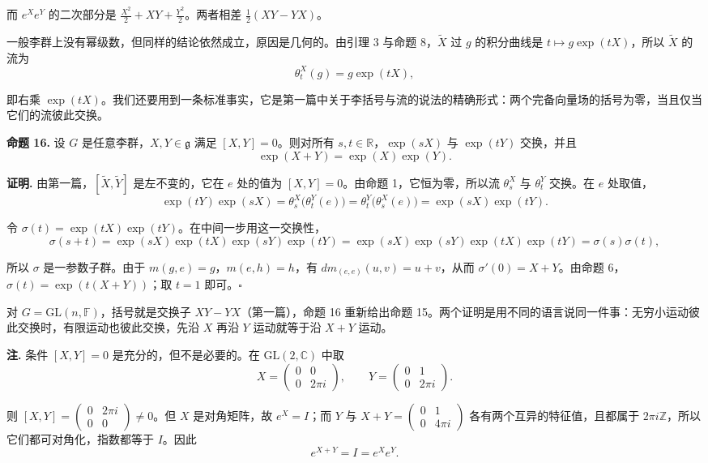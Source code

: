 \documentclass[11pt]{article}
\begin{document}
\begin{CJK*}{UTF8}{gbsn}
而 $e^X e^Y$ 的二次部分是 $\frac{X^2}{2} + XY + \frac{Y^2}{2}$。两者相差 $\frac12(XY - YX)$。

一般李群上没有幂级数，但同样的结论依然成立，原因是几何的。由引理 3 与命题 8，$\widetilde{X}$ 过 $g$ 的积分曲线是 $t \mapsto g\exp(tX)$，所以 $\widetilde{X}$ 的流为
\[
\theta^X_t(g) = g \exp(tX),
\]

即右乘 $\exp(tX)$。我们还要用到一条标准事实，它是第一篇中关于李括号与流的说法的精确形式：两个完备向量场的括号为零，当且仅当它们的流彼此交换。

\textbf{命题 16.} 设 $G$ 是任意李群，$X, Y \in \mathfrak{g}$ 满足 $[X, Y] = 0$。则对所有 $s, t \in \mathbb{R}$，$\exp(sX)$ 与 $\exp(tY)$ 交换，并且
\[
\exp(X + Y) = \exp(X) \exp(Y).
\]

\textbf{证明.} 由第一篇，$[\widetilde{X}, \widetilde{Y}]$ 是左不变的，它在 $e$ 处的值为 $[X, Y] = 0$。由命题 1，它恒为零，所以流 $\theta^X_s$ 与 $\theta^Y_t$ 交换。在 $e$ 处取值，
\[
\exp(tY)\exp(sX) = \theta^X_s\bigl(\theta^Y_t(e)\bigr) = \theta^Y_t\bigl(\theta^X_s(e)\bigr) = \exp(sX)\exp(tY).
\]

令 $\sigma(t) = \exp(tX)\exp(tY)$。在中间一步用这一交换性，
\[
\sigma(s + t) = \exp(sX)\exp(tX)\exp(sY)\exp(tY) = \exp(sX)\exp(sY)\exp(tX)\exp(tY) = \sigma(s)\sigma(t),
\]

所以 $\sigma$ 是一参数子群。由于 $m(g, e) = g$，$m(e, h) = h$，有 $dm_{(e,e)}(u, v) = u + v$，从而 $\sigma'(0) = X + Y$。由命题 6，$\sigma(t) = \exp(t(X + Y))$；取 $t = 1$ 即可。$\square$

对 $G = \mathrm{GL}(n, \mathbb{F})$，括号就是交换子 $XY - YX$（第一篇），命题 16 重新给出命题 15。两个证明是用不同的语言说同一件事：无穷小运动彼此交换时，有限运动也彼此交换，先沿 $X$ 再沿 $Y$ 运动就等于沿 $X + Y$ 运动。

\textbf{注.} 条件 $[X, Y] = 0$ 是充分的，但不是必要的。在 $\mathrm{GL}(2, \mathbb{C})$ 中取
\[
X = \begin{pmatrix} 0 & 0 \\ 0 & 2\pi i \end{pmatrix}, \qquad Y = \begin{pmatrix} 0 & 1 \\ 0 & 2\pi i \end{pmatrix}.
\]

则 $[X, Y] = \begin{pmatrix} 0 & 2\pi i \\ 0 & 0 \end{pmatrix} \ne 0$。但 $X$ 是对角矩阵，故 $e^X = I$；而 $Y$ 与 $X + Y = \begin{pmatrix} 0 & 1 \\ 0 & 4\pi i \end{pmatrix}$ 各有两个互异的特征值，且都属于 $2\pi i \mathbb{Z}$，所以它们都可对角化，指数都等于 $I$。因此
\[
e^{X+Y} = I = e^X e^Y.
\]


\end{CJK*}
\end{document}
